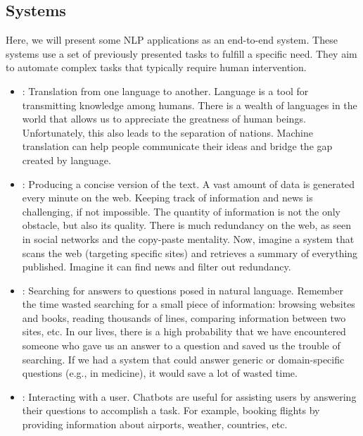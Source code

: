 \documentclass{KBook}
\begin{document}
\subsection{Systems}

Here, we will present some NLP applications as an end-to-end system. These systems use a set of previously presented tasks to fulfill a specific need. They aim to automate complex tasks that typically require human intervention.

\begin{itemize}
	\item {}: Translation from one language to another. Language is a tool for transmitting knowledge among humans. There is a wealth of languages in the world that allows us to appreciate the greatness of human beings. Unfortunately, this also leads to the separation of nations. Machine translation can help people communicate their ideas and bridge the gap created by language.
	
	\item {}: Producing a concise version of the text. A vast amount of data is generated every minute on the web. Keeping track of information and news is challenging, if not impossible. The quantity of information is not the only obstacle, but also its quality. There is much redundancy on the web, as seen in social networks and the copy-paste mentality. Now, imagine a system that scans the web (targeting specific sites) and retrieves a summary of everything published. Imagine it can find news and filter out redundancy.
	
	\item {}: Searching for answers to questions posed in natural language. Remember the time wasted searching for a small piece of information: browsing websites and books, reading thousands of lines, comparing information between two sites, etc. In our lives, there is a high probability that we have encountered someone who gave us an answer to a question and saved us the trouble of searching. If we had a system that could answer generic or domain-specific questions (e.g., in medicine), it would save a lot of wasted time.
	
	\item {}: Interacting with a user. Chatbots are useful for assisting users by answering their questions to accomplish a task. For example, booking flights by providing information about airports, weather, countries, etc.
	

\end{itemize}
\end{document}

